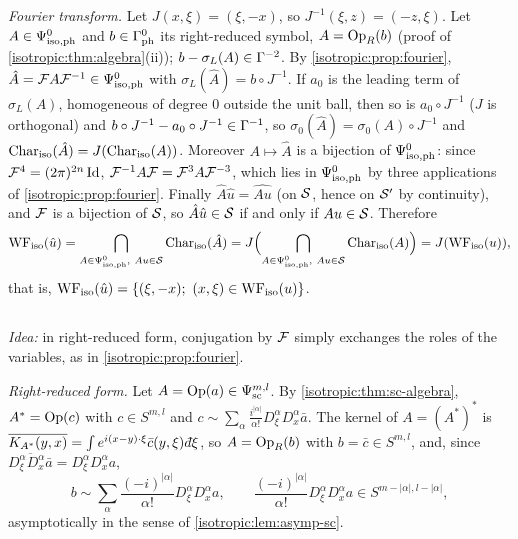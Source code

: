 \emph{Fourier transform.} Let $J(x,\xi)=(\xi,-x)$, so $J^{-1}(\xi,z)=(-z,\xi)$. Let
$A\in\Psi^{0}_{\mathrm{iso,ph}}$ and $b\in\Gamma^{0}_{\mathrm{ph}}$ its right-reduced symbol, $A=\operatorname{Op}_R(b)$
(proof of \cref{isotropic:thm:algebra}(ii)); $b-\sigma_L(A)\in\Gamma^{-2}$. By
\cref{isotropic:prop:fourier}, $\hat A=\mathcal{F} A\mathcal{F}^{-1}\in\Psi^{0}_{\mathrm{iso,ph}}$ with
$\sigma_L(\hat A)=b\circ J^{-1}$. If $a_0$ is the leading term of $\sigma_L(A)$,
homogeneous of degree $0$ outside the unit ball, then so is $a_0\circ J^{-1}$
($J$ is orthogonal) and $b\circ J^{-1}-a_0\circ J^{-1}\in\Gamma^{-1}$, so
$\sigma_0(\hat A)=\sigma_0(A)\circ J^{-1}$ and $\operatorname{Char}_{\mathrm{iso}}(\hat A)=J(\operatorname{Char}_{\mathrm{iso}}(A))$.
Moreover $A\mapsto\hat A$ is a bijection of $\Psi^{0}_{\mathrm{iso,ph}}$: since
$\mathcal{F}^4=(2\pi)^{2n}\operatorname{Id}$, $\mathcal{F}^{-1}A\mathcal{F}=\mathcal{F}^3A\mathcal{F}^{-3}$, which lies in $\Psi^{0}_{\mathrm{iso,ph}}$ by
three applications of \cref{isotropic:prop:fourier}. Finally
$\hat A\hat u=\widehat{Au}$ (on $\mathcal{S}$, hence on $\mathcal{S}'$ by continuity), and $\mathcal{F}$
is a bijection of $\mathcal{S}$, so $\hat A\hat u\in\mathcal{S}$ if and only if $Au\in\mathcal{S}$. Therefore
\begin{equation*}
  \WFiso(\hat u)=\bigcap_{A\in\Psiisoph0,\ Au\in\cS}\Char_{\mathrm{iso}}(\hat A)
  =J\Bigl(\bigcap_{A\in\Psiisoph0,\ Au\in\cS}\Char_{\mathrm{iso}}(A)\Bigr)=J(\WFiso(u)),
\end{equation*}
that is, $\WFiso(\hat u)=\{(\xi,-x);\ (x,\xi)\in\WFiso(u)\}$.

\subsection*{}

\emph{Idea:} in right-reduced form, conjugation by $\mathcal{F}$ simply exchanges the
roles of the variables, as in \cref{isotropic:prop:fourier}.

\emph{Right-reduced form.} Let $A=\operatorname{Op}(a)\in\Psi^{m,l}_{\mathrm{sc}}$. By
\cref{isotropic:thm:sc-algebra}, $A^*=\operatorname{Op}(c)$ with $c\in S^{m,l}$ and
$c\sim\sum_\alpha\frac{i^{|\alpha|}}{\alpha!}D_\xi^\alpha D_x^\alpha\bar a$. The kernel of
$A=(A^*)^*$ is $\overline{K_{A^*}(y,x)}=\int e^{i(x-y)\cdot\xi}\bar c(y,\xi)\,\dbar\xi$, so
$A=\operatorname{Op}_R(b)$ with $b=\bar c\in S^{m,l}$, and, since
$\overline{D_\xi^\alpha D_x^\alpha\bar a}=D_\xi^\alpha D_x^\alpha a$,
\begin{equation*}
  b\sim\sum_\alpha\frac{(-i)^{|\alpha|}}{\alpha!}D_\xi^\alpha D_x^\alpha a,\qquad
  \frac{(-i)^{|\alpha|}}{\alpha!}D_\xi^\alpha D_x^\alpha a\in S^{m-|\alpha|,l-|\alpha|},
\end{equation*}
asymptotically in the sense of \cref{isotropic:lem:asymp-sc}.


